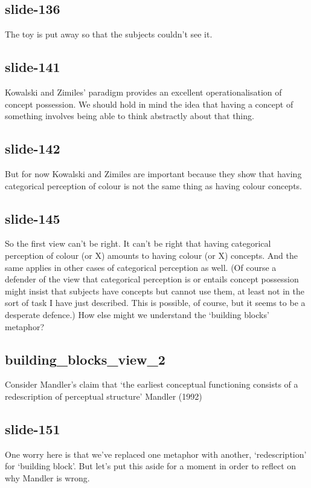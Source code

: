 \documentclass[12pt,\papersize]{extarticle}
\begin{document}
 
\subsection{slide-136}
The toy is put away so that the subjects couldn't see it.
 
 
\subsection{slide-141}
Kowalski and Zimiles' paradigm provides an excellent operationalisation of concept possession.
We should hold in mind the idea that having a concept of something involves being able to think abstractly about that thing.
 
 
\subsection{slide-142}
But for now Kowalski and Zimiles are important because they show that having categorical perception of colour is not the same thing as having colour concepts.
 
 
\subsection{slide-145}
So the first view can't be right.
It can't be right that having categorical perception of colour (or X) amounts to having colour (or X) concepts.
And the same applies in other cases of categorical perception as well.
(Of course a defender of the view that categorical perception is or entails concept possession might insist that subjects have concepts but cannot use them, at least not in the sort of task I have just described. This is possible, of course, but it seems to be a desperate defence.)
How else might we understand the ‘building blocks’ metaphor?
 
 
\subsection{building\_blocks\_view\_2}
Consider Mandler's claim that ‘the earliest conceptual functioning consists of a redescription of perceptual structure’ Mandler (1992)
 
 
\subsection{slide-151}
One worry here is that we've replaced one metaphor with another, ‘redescription’ for ‘building block’.
But let's put this aside for a moment in order to reflect on why Mandler is wrong.
 
\end{document}

